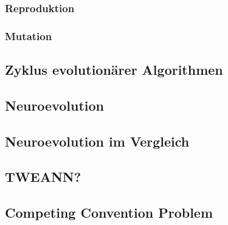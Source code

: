 \subsubsection{Reproduktion}
\subsubsection{Mutation}
\subsection{Zyklus evolutionärer Algorithmen}
\subsection{Neuroevolution}
\subsection{Neuroevolution im Vergleich}
\subsection{TWEANN?}
\label{subsec:tweann}
\subsection{Competing Convention Problem}
\label{subsec:competing_convention_problem}